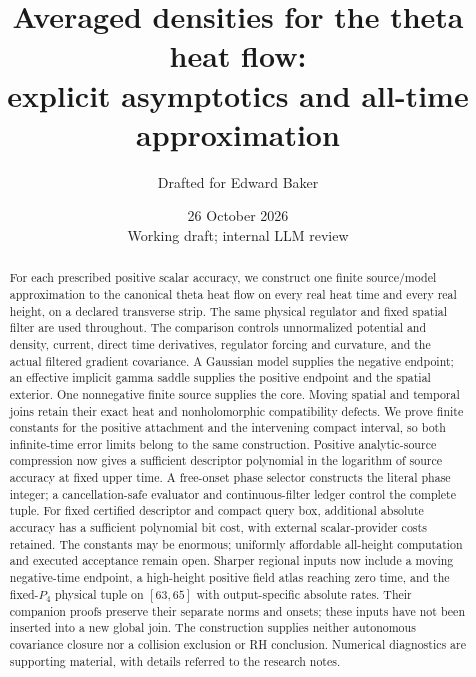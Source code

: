 \documentclass[11pt]{article}
\title{Averaged densities for the theta heat flow:\\
explicit asymptotics and all-time approximation}
\author{Drafted for Edward Baker}
\date{26 October 2026\\[3pt]\small Working draft; internal LLM review}
\theoremstyle{remark}\newtheorem{remark}[theorem]{Remark}
\numberwithin{equation}{section}
\begin{document}
\maketitle
\begin{abstract}
For each prescribed positive scalar accuracy, we construct one finite
source/model approximation to the canonical theta heat flow on every
real heat time and every real height, on a declared transverse strip.
The same physical regulator and fixed spatial filter are used throughout.
The comparison controls unnormalized potential and density, current,
direct time derivatives, regulator forcing and curvature, and the actual
filtered gradient covariance. A Gaussian model supplies the negative
endpoint; an effective implicit gamma saddle supplies the positive
endpoint and the spatial exterior. One nonnegative finite source supplies
the core. Moving spatial and temporal joins retain their exact heat and
nonholomorphic compatibility defects. We prove finite constants for the
positive attachment and the intervening compact interval, so both
infinite-time error limits belong to the same construction.
Positive analytic-source compression now gives a sufficient descriptor
polynomial in the logarithm of source accuracy at fixed upper time.
A free-onset phase selector constructs the literal phase integer; a
cancellation-safe evaluator and continuous-filter ledger control the
complete tuple. For fixed certified descriptor and compact query box,
additional absolute accuracy has a sufficient polynomial bit cost, with
external scalar-provider costs retained. The constants may be enormous;
uniformly affordable all-height computation and executed acceptance
remain open. Sharper regional inputs now include a moving negative-time
endpoint, a high-height positive field atlas reaching zero time, and the
fixed-$P_4$ physical tuple on $[63,65]$ with output-specific absolute
rates. Their companion proofs preserve their separate norms and onsets;
these inputs have not been inserted into a new global join.
The construction supplies neither autonomous covariance
closure nor a collision exclusion or RH conclusion. Numerical diagnostics
are supporting material, with details referred to the research notes.
\end{abstract}
\tableofcontents





















\appendix


\end{document}

